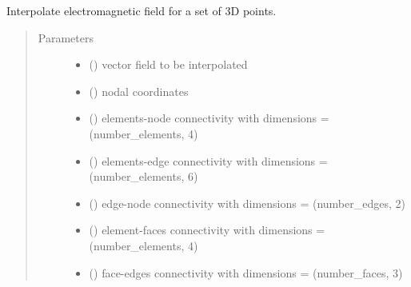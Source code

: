 \documentclass[letterpaper,10pt,english]{sphinxmanual}
\begin{document}
\begin{fulllineitems}
\label{\detokenize{petgem/postprocessing:petgem.postprocessing.fieldInterpolator}}
Interpolate electromagnetic field for a set of 3D points.
\begin{quote}\begin{description}
\item[{Parameters}] \leavevmode\begin{itemize}
\item {} 
 () \textendash{} vector field to be interpolated

\item {} 
 () \textendash{} nodal coordinates

\item {} 
 () \textendash{} elements-node connectivity with dimensions = (number\_elements, 4)

\item {} 
 () \textendash{} elements-edge connectivity with dimensions = (number\_elements, 6)

\item {} 
 () \textendash{} edge-node connectivity with dimensions = (number\_edges, 2)

\item {} 
 () \textendash{} element-faces connectivity with dimensions = (number\_elements, 4)

\item {} 
 () \textendash{} face-edges connectivity with dimensions = (number\_faces, 3)


\end{itemize}
\end{description}
\end{quote}
\end{fulllineitems}
\end{document}
